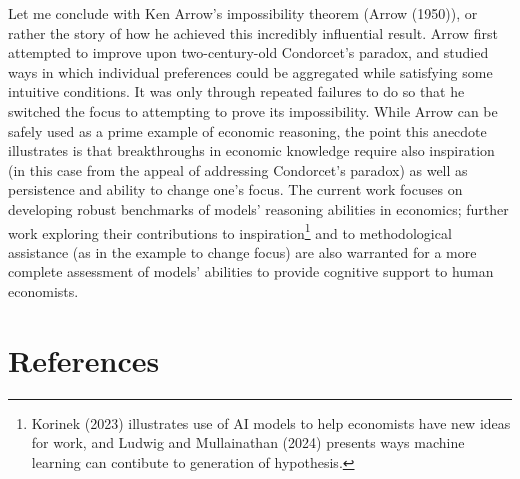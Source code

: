 \documentclass[
]{article}
\begin{document}
Let me conclude with Ken Arrow's impossibility theorem (Arrow (1950)),
or rather the story of how he achieved this incredibly influential
result. Arrow first attempted to improve upon two-century-old
Condorcet's paradox, and studied ways in which individual preferences
could be aggregated while satisfying some intuitive conditions. It was
only through repeated failures to do so that he switched the focus to
attempting to prove its impossibility. While Arrow can be safely used as
a prime example of economic reasoning, the point this anecdote
illustrates is that breakthroughs in economic knowledge require also
inspiration (in this case from the appeal of addressing Condorcet's
paradox) as well as persistence and ability to change one's focus. The
current work focuses on developing robust benchmarks of models'
reasoning abilities in economics; further work exploring their
contributions to inspiration\footnote{Korinek (2023) illustrates use of
  AI models to help economists have new ideas for work, and Ludwig and
  Mullainathan (2024) presents ways machine learning can contibute to
  generation of hypothesis.} and to methodological assistance (as in the
example to change focus) are also warranted for a more complete
assessment of models' abilities to provide cognitive support to human
economists.

\section*{References}\label{references}
\end{document}
